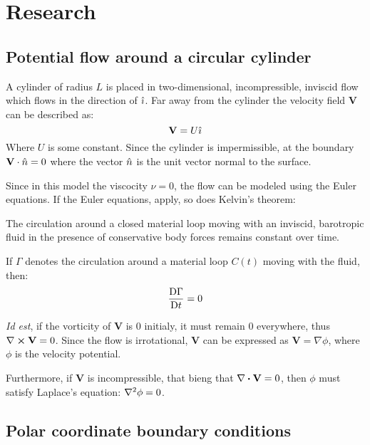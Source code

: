 \newpage
\section{Research}
\subsection{Potential flow around a circular cylinder}
A cylinder of radius $L$ is placed in two-dimensional, incompressible, inviscid flow which flows in the direction of $\hat{\imath}$.
Far away from the cylinder the velocity field $\mathbf{V}$ can be described as: 
\begin{equation}\label{equation:in-infinitum}
	\mathbf{V}=U\hat{\imath}
\end{equation}
Where $U$ is some constant. Since the cylinder is impermissible, at the boundary $\mathbf{V}\cdot\hat{n}=0$ where the vector $\hat{n}$ is the unit vector normal to the surface. 

Since in this model the viscocity $\nu=0$, the flow can be modeled using the Euler equations. If the Euler equations, apply, so does Kelvin's theorem:
\begin{theorem}
	The circulation around a closed material loop moving with an inviscid, barotropic fluid in the presence of conservative body forces remains constant over time.\needcitation
	
	If $\Gamma$ denotes the circulation around a material loop $C(t)$ moving with the fluid, then:
	$$\frac{\mathrm{D} \Gamma}{\mathrm{D} t}=0$$
\end{theorem}

\textit{Id est}, if the vorticity of $\mathbf{V}$ is $0$ initialy, it must remain $0$ everywhere, thus $\curl\mathbf{V}=0$. Since the flow is irrotational, $\mathbf{V}$ can be expressed as $\mathbf{V}=\nabla\phi$, where $\phi$ is the velocity potential.

Furthermore, if $\mathbf{V}$ is incompressible, that bieng that $\divergence\mathbf{V}=0$, then $\phi$ must satisfy Laplace's equation: $\laplacian{\phi}=0$.

\subsection{Polar coordinate boundary conditions}
